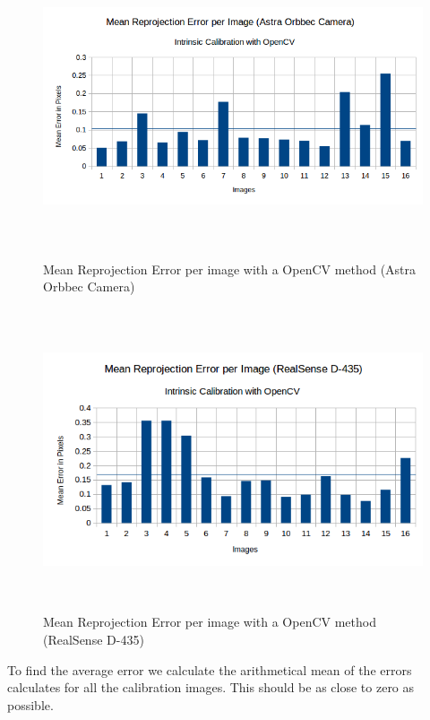 \begin{figure}[!h]
\begin{center}
\includegraphics[width=5in, height=3.5in]{figures05/opencv_int_cal_astra.png}
\caption{Mean Reprojection Error per image with a OpenCV method (Astra Orbbec Camera)}%
\label{fig:astraopen}
\end{center}
\end{figure}

\begin{figure}[!h]
\begin{center}
\includegraphics[width=5in, height=3.5in]{figures05/opencv_int_cal_real.png}
\caption{Mean Reprojection Error per image with a OpenCV method (RealSense D-435)}%
\label{fig:realopen}
\end{center}
\end{figure}

To find the average error we calculate the arithmetical mean of the errors calculates for all the calibration images. This should be as close to zero as possible. 

